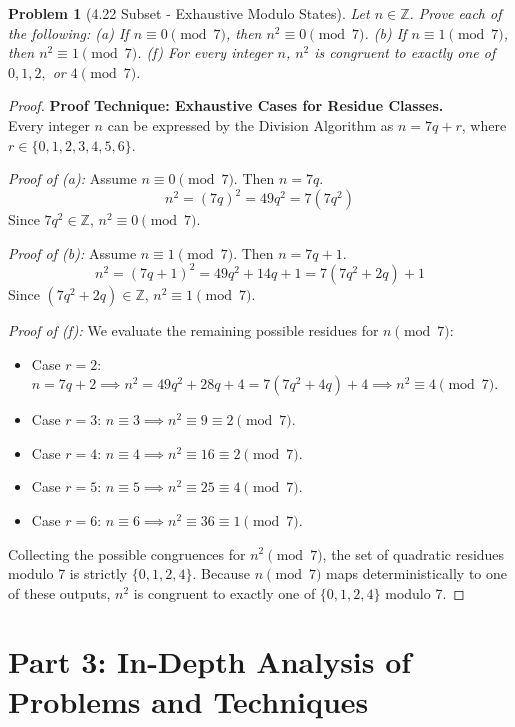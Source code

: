 \documentclass[11pt]{article}
\newtheorem{problem}{Problem}
\begin{document}
\begin{problem}[4.22 Subset - Exhaustive Modulo States]
Let $n \in \mathbb{Z}$. Prove each of the following: 
(a) If $n \equiv 0 \pmod 7$, then $n^2 \equiv 0 \pmod 7$.
(b) If $n \equiv 1 \pmod 7$, then $n^2 \equiv 1 \pmod 7$.
(f) For every integer $n$, $n^2$ is congruent to exactly one of $0, 1, 2,$ or $4 \pmod 7$.
\end{problem}
\begin{proof}
\textbf{Proof Technique: Exhaustive Cases for Residue Classes.} \\
Every integer $n$ can be expressed by the Division Algorithm as $n = 7q + r$, where $r \in \{0, 1, 2, 3, 4, 5, 6\}$. 

\textit{Proof of (a):} Assume $n \equiv 0 \pmod 7$. Then $n = 7q$. 
\[ n^2 = (7q)^2 = 49q^2 = 7(7q^2) \]
Since $7q^2 \in \mathbb{Z}$, $n^2 \equiv 0 \pmod 7$. 

\textit{Proof of (b):} Assume $n \equiv 1 \pmod 7$. Then $n = 7q + 1$.
\[ n^2 = (7q + 1)^2 = 49q^2 + 14q + 1 = 7(7q^2 + 2q) + 1 \]
Since $(7q^2 + 2q) \in \mathbb{Z}$, $n^2 \equiv 1 \pmod 7$.

\textit{Proof of (f):} We evaluate the remaining possible residues for $n \pmod 7$:
\begin{itemize}
    \item Case $r=2$: $n = 7q + 2 \implies n^2 = 49q^2 + 28q + 4 = 7(7q^2 + 4q) + 4 \implies n^2 \equiv 4 \pmod 7$.
    \item Case $r=3$: $n \equiv 3 \implies n^2 \equiv 9 \equiv 2 \pmod 7$.
    \item Case $r=4$: $n \equiv 4 \implies n^2 \equiv 16 \equiv 2 \pmod 7$.
    \item Case $r=5$: $n \equiv 5 \implies n^2 \equiv 25 \equiv 4 \pmod 7$.
    \item Case $r=6$: $n \equiv 6 \implies n^2 \equiv 36 \equiv 1 \pmod 7$.
\end{itemize}
Collecting the possible congruences for $n^2 \pmod 7$, the set of quadratic residues modulo 7 is strictly $\{0, 1, 2, 4\}$. Because $n \pmod 7$ maps deterministically to one of these outputs, $n^2$ is congruent to exactly one of $\{0, 1, 2, 4\}$ modulo 7.
\end{proof}

\newpage
\section{Part 3: In-Depth Analysis of Problems and Techniques}
\end{document}
